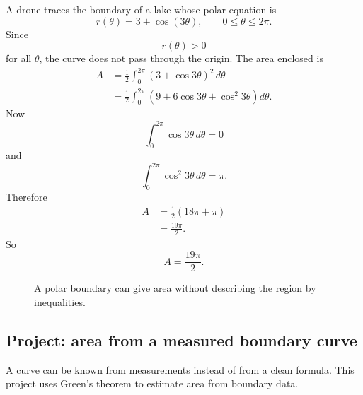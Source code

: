\begin{example}
A drone traces the boundary of a lake whose polar equation is
\[
    r(\theta)=3+\cos(3\theta),
    \qquad
    0\le \theta\le2\pi.
\]
Since
\[
    r(\theta)>0
\]
for all \(\theta\), the curve does not pass through the origin.  The area enclosed is
\[
\begin{aligned}
A
&=
\frac12\int_0^{2\pi}(3+\cos3\theta)^2\,d\theta\\
&=
\frac12\int_0^{2\pi}
\left(9+6\cos3\theta+\cos^2 3\theta\right)d\theta.
\end{aligned}
\]
Now
\[
    \int_0^{2\pi}\cos3\theta\,d\theta=0
\]
and
\[
    \int_0^{2\pi}\cos^2 3\theta\,d\theta=\pi.
\]
Therefore
\[
\begin{aligned}
A
&=
\frac12(18\pi+\pi)\\
&=
\frac{19\pi}{2}.
\end{aligned}
\]
So
\[
\boxed{
    A=\frac{19\pi}{2}.
}
\]

\begin{figure}[h]
\centering
{}
\caption{A polar boundary can give area without describing the region by inequalities.}
\end{figure}
\end{example}

\subsection{Project: area from a measured boundary curve}

A curve can be known from measurements instead of from a clean formula.  This project
uses Green's theorem to estimate area from boundary data.

